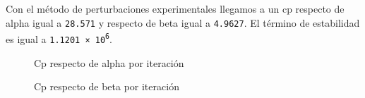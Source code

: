 \documentclass[11pt,a4paper]{article}
\begin{document}
Con el método de perturbaciones experimentales llegamos a un cp respecto de alpha igual a \texttt{28.571} y respecto de beta igual a \texttt{4.9627}. El término de estabilidad es igual a \texttt{\num{1.1201e6}}.

\begin{figure}[H]
	\caption{Cp respecto de alpha por iteración}
	\label{fig:cpsa}
\end{figure}

\begin{figure}[H]
	\caption{Cp respecto de beta por iteración}
	\label{fig:cpsb}
\end{figure}
\end{document}
